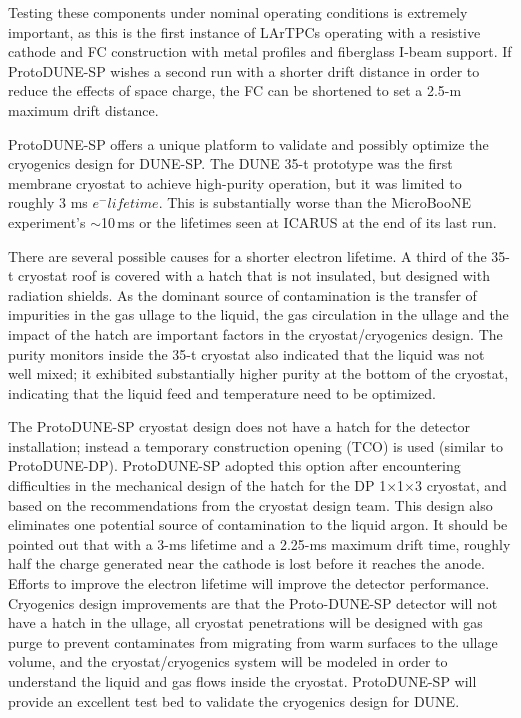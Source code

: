 
Testing these components under nominal operating conditions is extremely important, as this is the first instance of LArTPCs operating with a resistive cathode %
and FC construction with metal profiles and fiberglass I-beam support. 
If ProtoDUNE-SP wishes a second run with a shorter drift distance in order to reduce the effects of space charge, the FC can be shortened to set a 2.5-m maximum drift distance.

ProtoDUNE-SP offers a unique platform to validate and possibly optimize the cryogenics design for DUNE-SP. The DUNE 35-t prototype was the first membrane cryostat to achieve high-purity operation, but it was limited to roughly 3 ms $e^-lifetime$. This is substantially worse than the MicroBooNE experiment's  $\sim$10\,ms or the lifetimes seen at ICARUS at the end of its last run. 

There are several possible causes for a shorter electron lifetime.  A third of the 35-t cryostat roof is covered with a hatch that is not insulated, but designed with radiation shields. As the dominant source of contamination is the transfer of impurities in the gas ullage to the liquid, the gas circulation in the ullage and the impact of the hatch are important factors in the cryostat/cryogenics design. The purity monitors inside the 35-t cryostat also indicated that the liquid was not well mixed; it exhibited substantially higher purity at the bottom of the cryostat, indicating that the liquid feed and temperature need to be optimized.  

The ProtoDUNE-SP cryostat design does not have a hatch for the detector installation; instead a temporary construction opening (TCO) is used (similar to ProtoDUNE-DP). %
ProtoDUNE-SP adopted this option after encountering difficulties in the mechanical design of the hatch for the DP 1$\times$1$\times$3 cryostat, 
and based on the recommendations from the cryostat design team.  This design also eliminates one potential source of contamination to the liquid argon. 
It should be pointed out that with a 3-ms lifetime and a 2.25-ms maximum drift time, roughly half the charge generated near the cathode is lost before it reaches the anode. Efforts to improve the electron lifetime will improve the detector performance.  Cryogenics design improvements are that the Proto-DUNE-SP detector will not have a hatch in the ullage, all cryostat penetrations will be designed with gas purge to prevent contaminates from migrating from warm surfaces to the ullage volume, and the cryostat/cryogenics system will be modeled in order to understand the liquid and gas flows inside the cryostat. ProtoDUNE-SP will provide an excellent test bed to validate the cryogenics design for DUNE. 

